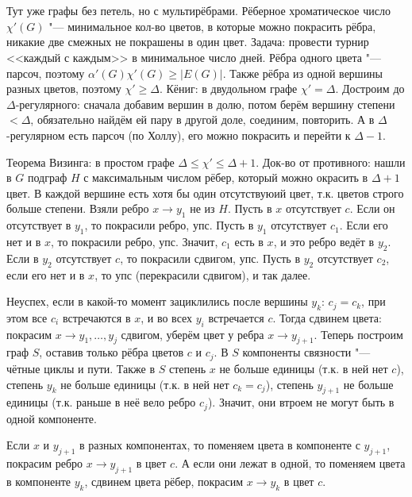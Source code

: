\section{} %
	Тут уже графы без петель, но с мультирёбрами.
	Рёберное хроматическое число $\chi'(G)$ "--- минимальное кол-во цветов, в которые можно покрасить рёбра,
	никакие две смежных не покрашены в один цвет.
	Задача: провести турнир <<каждый с каждым>> в минимальное число дней.
	Рёбра одного цвета "--- парсоч, поэтому $\alpha'(G)\chi'(G) \ge |E(G)|$.
	Также рёбра из одной вершины разных цветов, поэтому $\chi' \ge \Delta$.
	Кёниг: в двудольном графе $\chi' = \Delta$.
	Достроим до $\Delta$-регулярного: сначала добавим вершин в долю, потом берём вершину степени $<\Delta$,
	обязательно найдём ей пару в другой доле, соединим, повторить.
	А в $\Delta$-регулярном есть парсоч (по Холлу), его можно покрасить и перейти к $\Delta-1$.

	Теорема Визинга: в простом графе $\Delta \le \chi' \le \Delta + 1$.
	Док-во от противного: нашли в $G$ подграф $H$ с максимальным числом рёбер, который можно окрасить в $\Delta+1$ цвет.
	В каждой вершине есть хотя бы один отсутствуюий цвет, т.к. цветов строго больше степени.
	Взяли ребро $x\to y_1$ не из $H$.
	Пусть в $x$ отсутствует $c$.
	Если он отсутствует в $y_1$, то покрасили ребро, упс.
	Пусть в $y_1$ отсутствует $c_1$.
	Если его нет и в $x$, то покрасили ребро, упс.
	Значит, $c_1$ есть в $x$, и это ребро ведёт в $y_2$.
	Если в $y_2$ отсутствует $c$, то покрасили сдвигом, упс.
	Пусть в $y_2$ отсутствует $c_2$, если его нет и в $x$, то упс (перекрасили сдвигом), и так далее.

	Неуспех, если в какой-то момент зациклились после вершины $y_k$: $c_j=c_k$, при этом все $c_i$ встречаются в $x$, и во всех $y_i$ встречается $c$.
	Тогда сдвинем цвета: покрасим $x \to y_1, \dots, y_{j}$ сдвигом, уберём цвет у ребра $x \to y_{j+1}$.
	Теперь построим граф $S$, оставив только рёбра цветов $c$ и $c_j$.
	В $S$ компоненты связности "--- чётные циклы и пути.
	Также в $S$ степень $x$ не больше единицы (т.к. в ней нет $c$), степень $y_k$ не больше единицы (т.к. в ней нет $c_k=c_j$),
	степень $y_{j+1}$ не больше единицы (т.к. раньше в неё вело ребро $c_j$).
	Значит, они втроем не могут быть в одной компоненте.

	Если $x$ и $y_{j+1}$ в разных компонентах, то поменяем цвета в компоненте с $y_{j+1}$, покрасим ребро $x\to y_{j+1}$ в цвет $c$.
	А если они лежат в одной, то поменяем цвета в компоненте $y_k$, сдвинем цвета рёбер, покрасим $x \to y_k$ в цвет $c$.

